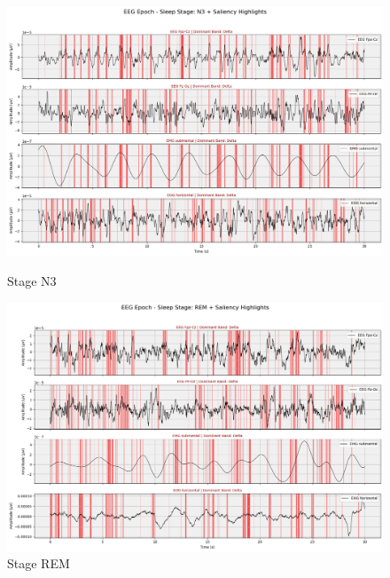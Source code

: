 \begin{figure}[htbp]
	\centering
	\begin{minipage}[b]{0.45\linewidth}
		\includegraphics[width=\linewidth]{"img/paper_3/stage n3"}
		\caption{Stage N3}
		\label{fig:stage-n3}
	\end{minipage}
	\hfill
	\begin{minipage}[b]{0.45\linewidth}
		\includegraphics[width=\linewidth]{"img/paper_3/stage rem"}
		\caption{Stage REM}
		\label{fig:stage-rem}
	\end{minipage}
\end{figure}

